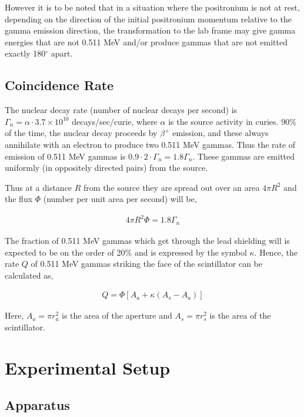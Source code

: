 However it is to be noted that in a situation where the positronium is not at rest, depending on the direction of the initial positronium momentum relative to the gamma emission direction, the transformation to the lab frame may give gamma energies that are not 0.511 MeV and/or produce gammas that are not emitted exactly 180$^\circ$ apart.

\subsection{Coincidence Rate}

The nuclear decay rate (number of nuclear decays per second) is $\Gamma_n = \alpha \cdot 3.7 \times 10^{10}$ decays/sec/curie, where $\alpha$ is the source activity in curies. 90\% of the time, the nuclear decay proceeds by $\beta^+$ emission, and these always annihilate with an electron to produce two 0.511 MeV gammas. Thus the rate of emission of 0.511 MeV gammas is $0.9 \cdot 2 \cdot \Gamma_n = 1.8\Gamma_n$. These gammas are emitted uniformly (in oppositely directed pairs) from the source. 

Thus at a distance $R$ from the source they are spread out over an area $4\pi R^2$ and the flux $\Phi$ (number per unit area per second) will be,

\begin{align}
    4\pi R^2\Phi = 1.8\Gamma_n 
\end{align}

The fraction of 0.511 MeV gammas which get through the lead shielding will  is expected to be on the order of 20\% and is expressed by the symbol $\kappa$. Hence, the rate $Q$ of 0.511 MeV gammas striking the face of the scintillator can be calculated as,

\begin{align}
    Q = \Phi[A_a+\kappa(A_s-A_a)]
\end{align}

Here, $A_a = \pi r_a^2$ is the area of the aperture and $A_s=\pi r_s^2$ is the area of the scintillator.

\section{Experimental Setup}

\subsection*{Apparatus}

